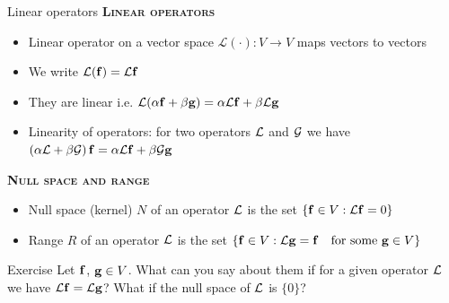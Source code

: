 \begin{frame}{Linear operators}	
	\textbf{\textsc{Linear operators}}
	\begin{itemize}
		\item Linear operator on a vector space $ \mathcal{L} (\cdot)  : V \to V $ maps vectors to vectors
		\item We write $ \mathcal{L}(\mathbf{f}) = \mathcal{L} \mathbf{f} $
		\item They are linear i.e. $ \mathcal{L}(\alpha \mathbf{f} + \beta \mathbf{g}) 
		= \alpha \mathcal{L} \mathbf{f} + \beta \mathcal{L} \mathbf{g} $
		\item Linearity of operators: for two operators $ \mathcal{L} $ and $ \mathcal{G} $ we have $ \left( \alpha \mathcal{L} + \beta \mathcal{G} \right) \mathbf{f} = \alpha \mathcal{L} \mathbf{f} + \beta \mathcal{G} \mathbf{g} $
	\end{itemize}
	\textbf{\textsc{Null space and range}}
	\begin{itemize}
		\item \alert{Null space} (kernel) $ N $ of an operator $ \mathcal{L} $ is the set $ \{ \mathbf{f} \in V : \mathcal{L} \mathbf{f} = 0 \} $
		\item \alert{Range} $ R $ of an operator $ \mathcal{L} $ is the set $ \{ \mathbf{f} \in V : \mathcal{L} \mathbf{g} = \mathbf{f}\quad \text{for some $ \mathbf{g} \in V $} \} $
	\end{itemize}
\end{frame}


\begin{frame}{Exercise \theexercise}
	Let $ \mathbf{f} $, $ \mathbf{g} \in V $. What can you say about them if for a given operator $ \mathcal{L} $ we have $ \mathcal{L} \mathbf{f} = \mathcal{L} \mathbf{g} $? What if the null space of $ \mathcal{L} $ is $ \{ 0 \} $?
\end{frame}




